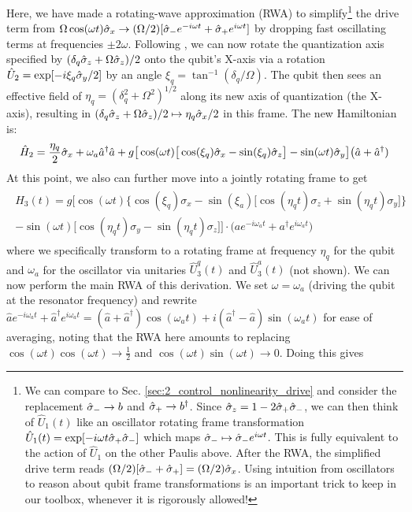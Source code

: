 Here, we have made a rotating-wave approximation (RWA) to simplify\footnote{We can compare to Sec. \ref{sec:2_control_nonlinearity_drive} and consider the replacement $\hat{\sigma}_- \to b$ and $\hat{\sigma}_+\to b^\dagger$. Since $\hat{\sigma}_z = 1-2\hat{\sigma}_+\hat{\sigma}_-$, we can then think of $\hat{U}_1(t)$ like an oscillator rotating frame transformation $\hat{U}_1(t) = \exp[-i\omega t \hat{\sigma}_+\hat{\sigma}_-]$ which maps $\hat{\sigma}_- \mapsto \hat{\sigma}_- e^{i\omega t}$. This is fully equivalent to the action of $\hat{U}_1$ on the other Paulis above. After the RWA, the simplified drive term reads $(\Omega/2)[\hat{\sigma}_- + \hat{\sigma}_+] = (\Omega/2)\hat{\sigma}_x$. Using intuition from oscillators to reason about qubit frame transformations is an important trick to keep in our toolbox, whenever it is rigorously allowed!} the drive term from $\Omega \cos(\omega t)\hat{\sigma}_x \to (\Omega/2)[\hat{\sigma}_- e^{-i\omega t} + \hat{\sigma}_+ e^{i\omega t}]$ by dropping fast oscillating terms at frequencies $\pm 2\omega$. Following \cite{rigetti2010fully}, we can now rotate the quantization axis specified by $(\delta_q\hat{\sigma}_z + \Omega\hat{\sigma}_z)/2$ onto the qubit's X-axis via a rotation $\hat{U}_2 = \exp[-i\xi_q\hat{\sigma}_y/2]$ by an angle $\xi_q = \tan^{-1}(\delta_q/\Omega)$. The qubit then sees an effective field of $\eta_q = (\delta_q^2 + \Omega^2)^{1/2}$ along its new axis of quantization (the X-axis), resulting in $(\delta_q\hat{\sigma}_z + \Omega\hat{\sigma}_z)/2 \mapsto \eta_q\hat{\sigma}_x/2$ in this frame. The new Hamiltonian is:
\begin{equation}
\hat{H}_2 = \frac{\eta_q}{2}\hat{\sigma}_x + \omega_a \hat{a}^\dagger \hat{a} + g\big[\cos(\omega t)\big[\cos(\xi_q)\hat{\sigma}_x -\sin(\xi_q)\hat{\sigma}_z\big]- \sin(\omega t)\hat{\sigma}_y\big]\big(\hat{a} + \hat{a}^\dagger)
\end{equation}
At this point, we also can further move into a jointly rotating frame to get
\begin{align}
\begin{split}
H_3(t) = g\bigg[\cos(\omega t)\Big\{\cos(\xi_q)\sigma_x -\sin(\xi_a)\big[\cos(\eta_q t)\sigma_z + \sin(\eta_q t)\sigma_y\big]\Big\} \\ - \sin(\omega t)\big[\cos(\eta_q t)\sigma_y - \sin(\eta_q t)\sigma_z\big]\bigg]\cdot\Big(a e^{-i\omega_a t} + a^\dagger e^{i\omega_a t}\Big)
\end{split}
\end{align}
where we specifically transform to a rotating frame at frequency $\eta_q$ for the qubit and $\omega_a$ for the oscillator via unitaries $\hat{U}_3^q(t)$ and $\hat{U}_3^a(t)$ (not shown). We can now perform the main RWA of this derivation. We set $\omega = \omega_a$ (driving the qubit at the resonator frequency) and rewrite  $\hat{a} e^{-i\omega_a t} + \hat{a}^\dagger e^{i\omega_a t} = (\hat{a}+\hat{a}^\dagger)\cos(\omega_a t) + i(\hat{a}^\dagger - \hat{a})\sin(\omega_a t)$ for ease of averaging, noting that the RWA here amounts to replacing $\cos(\omega t)\cos(\omega t) \to \frac{1}{2}$ and $\cos(\omega t)\sin(\omega t) \to 0$. Doing this gives
